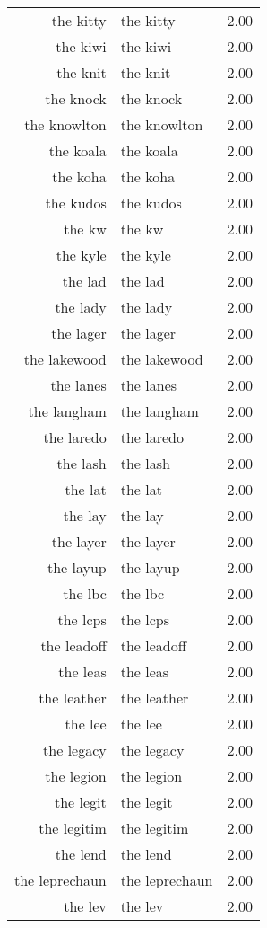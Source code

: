 \begin{table}[ht]
\begin{tabular}{rlr}
  the kitty & the kitty & 2.00 \\ 
  the kiwi & the kiwi & 2.00 \\ 
  the knit & the knit & 2.00 \\ 
  the knock & the knock & 2.00 \\ 
  the knowlton & the knowlton & 2.00 \\ 
  the koala & the koala & 2.00 \\ 
  the koha & the koha & 2.00 \\ 
  the kudos & the kudos & 2.00 \\ 
  the kw & the kw & 2.00 \\ 
  the kyle & the kyle & 2.00 \\ 
  the lad & the lad & 2.00 \\ 
  the lady & the lady & 2.00 \\ 
  the lager & the lager & 2.00 \\ 
  the lakewood & the lakewood & 2.00 \\ 
  the lanes & the lanes & 2.00 \\ 
  the langham & the langham & 2.00 \\ 
  the laredo & the laredo & 2.00 \\ 
  the lash & the lash & 2.00 \\ 
  the lat & the lat & 2.00 \\ 
  the lay & the lay & 2.00 \\ 
  the layer & the layer & 2.00 \\ 
  the layup & the layup & 2.00 \\ 
  the lbc & the lbc & 2.00 \\ 
  the lcps & the lcps & 2.00 \\ 
  the leadoff & the leadoff & 2.00 \\ 
  the leas & the leas & 2.00 \\ 
  the leather & the leather & 2.00 \\ 
  the lee & the lee & 2.00 \\ 
  the legacy & the legacy & 2.00 \\ 
  the legion & the legion & 2.00 \\ 
  the legit & the legit & 2.00 \\ 
  the legitim & the legitim & 2.00 \\ 
  the lend & the lend & 2.00 \\ 
  the leprechaun & the leprechaun & 2.00 \\ 
  the lev & the lev & 2.00 \\ 

\end{tabular}
\end{table}

